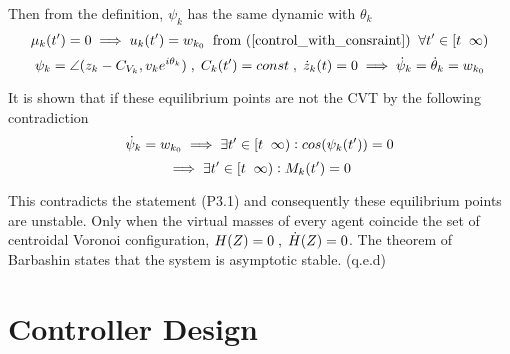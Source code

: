 \noindent Then from the definition, $\psi_{k}$ has the same dynamic with ${\theta_{k}}$\\
\[\mu_k(t') = 0 \implies u_{k}(t') = w_{k_0} \txtspc{ } \text{from (\ref{control_with_consraint})} \txtspc{ } \forall t' \in [t \txtspc{ } \infty)\]
\[\psi_{k} = \angle (z_{k} - C_{V_{k}}, v_{k}e^{i\theta_{k}}) \txtspc{,} C_k(t') = const \txtspc{,} \dot z_k(t) = 0 \implies \dot \psi_{k} = \dot \theta_{k} = w_{k_0}\]

\noindent It is shown that if these equilibrium points are not the CVT by the following contradiction
\[\dot \psi_{k} = w_{k_0} \implies \exists t' \in [t \txtspc{ } \infty): cos(\psi_{k}(t')) = 0 \]
\[\implies \exists t' \in [t \txtspc{ } \infty): M_k(t') = 0\]

\noindent This contradicts the statement (P3.1) and consequently these equilibrium points are unstable. Only when the virtual masses of every agent coincide the set of centroidal Voronoi configuration, ${H(Z) = 0 \txtspc{,} \dot H(Z) = 0}$. The theorem of Barbashin states that the system is asymptotic stable. (q.e.d)

\section{Controller Design}
